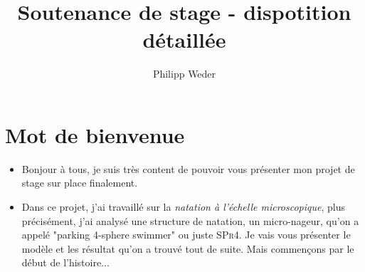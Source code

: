 \documentclass[12pt,a4paper]{article}
\author{Philipp Weder}
\title{Soutenance de stage - dispotition détaillée}
\theoremstyle{plain}
\theoremstyle{plain}
\theoremstyle{plain}
\theoremstyle{definition}
\theoremstyle{definition}
\theoremstyle{definition}
\theoremstyle{plain}
\begin{document}
\renewcommand\labelitemi{--}

\maketitle
\section{Mot de bienvenue}
\begin{itemize}
\item Bonjour à tous, je suis très content de pouvoir vous présenter mon projet de stage sur place finalement.
\item Dans ce projet, j'ai travaillé sur la \emph{natation à l'échelle microscopique}, plus précisément, j'ai analysé une structure de natation, un micro-nageur, qu'on a appelé "parking 4-sphere swimmer" ou juste \textsc{SPr4}. Je vais vous présenter le modèle et les résultat qu'on a trouvé tout de suite. Mais commençons par le début de l'histoire...
\end{itemize}
\end{document}
